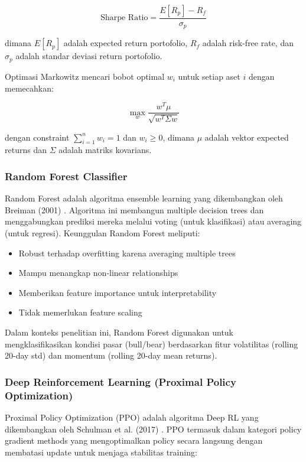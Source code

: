 \documentclass[12pt,a4paper]{article}
\begin{document}
\begin{equation}
\text{Sharpe Ratio} = \frac{E[R_p] - R_f}{\sigma_p}
\end{equation}

dimana $E[R_p]$ adalah expected return portofolio, $R_f$ adalah risk-free rate, dan $\sigma_p$ adalah standar deviasi return portofolio.

Optimasi Markowitz mencari bobot optimal $w_i$ untuk setiap aset $i$ dengan memecahkan:

\begin{equation}
\max_{w} \frac{w^T \mu}{\sqrt{w^T \Sigma w}}
\end{equation}

dengan constraint $\sum_{i=1}^{n} w_i = 1$ dan $w_i \geq 0$, dimana $\mu$ adalah vektor expected returns dan $\Sigma$ adalah matriks kovarians.

\subsubsection{Random Forest Classifier}

Random Forest adalah algoritma ensemble learning yang dikembangkan oleh Breiman (2001) \cite{breiman2001random}. Algoritma ini membangun multiple decision trees dan menggabungkan prediksi mereka melalui voting (untuk klasifikasi) atau averaging (untuk regresi). Keunggulan Random Forest meliputi:

\begin{itemize}
    \item Robust terhadap overfitting karena averaging multiple trees
    \item Mampu menangkap non-linear relationships
    \item Memberikan feature importance untuk interpretability
    \item Tidak memerlukan feature scaling
\end{itemize}

Dalam konteks penelitian ini, Random Forest digunakan untuk mengklasifikasikan kondisi pasar (bull/bear) berdasarkan fitur volatilitas (rolling 20-day std) dan momentum (rolling 20-day mean returns).

\subsubsection{Deep Reinforcement Learning (Proximal Policy Optimization)}

Proximal Policy Optimization (PPO) adalah algoritma Deep RL yang dikembangkan oleh Schulman et al. (2017) \cite{schulman2017proximal}. PPO termasuk dalam kategori policy gradient methods yang mengoptimalkan policy secara langsung dengan membatasi update untuk menjaga stabilitas training:
\end{document}
